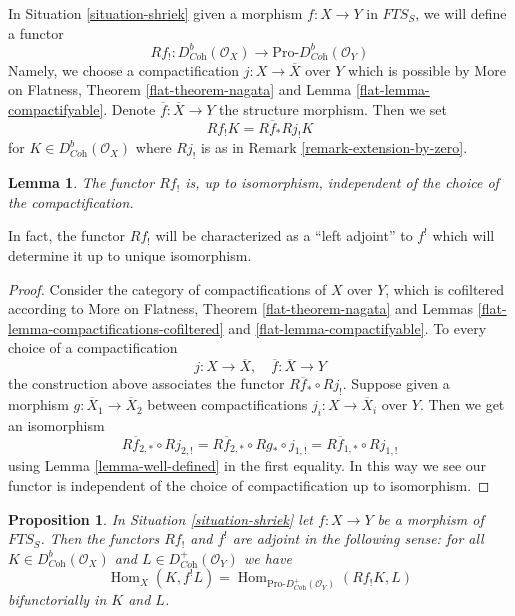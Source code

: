 \documentclass{stacks-project}
\theoremstyle{plain}
\newtheorem{proposition}[subsection]{Proposition}
\newtheorem{lemma}[subsection]{Lemma}
\theoremstyle{definition}
\theoremstyle{remark}
\numberwithin{equation}{subsection}
\def\Hom{\mathop{\mathrm{Hom}}\nolimits}
\begin{document}
\noindent
In Situation \ref{situation-shriek} given a morphism $f : X \to Y$
in $\textit{FTS}_S$, we will define a functor
$$
Rf_! : D^b_{\textit{Coh}}(\mathcal{O}_X)
\longrightarrow
\text{Pro-}D^b_{\textit{Coh}}(\mathcal{O}_Y)
$$
Namely, we choose a compactification $j : X \to \overline{X}$ over $Y$
which is possible by More on Flatness, Theorem \ref{flat-theorem-nagata} and
Lemma \ref{flat-lemma-compactifyable}. Denote
$\overline{f} : \overline{X} \to Y$ the structure morphism. Then we set
$$
Rf_!K  = R\overline{f}_* Rj_! K
$$
for $K \in D^b_{\textit{Coh}}(\mathcal{O}_X)$ where $Rj_!$ is
as in Remark \ref{remark-extension-by-zero}.

\begin{lemma}
\label{lemma-lower-shriek-well-defined}
The functor $Rf_!$ is, up to isomorphism, independent
of the choice of the compactification.
\end{lemma}

\noindent
In fact, the functor $Rf_!$ will be characterized as a ``left adjoint''
to $f^!$ which will determine it up to unique isomorphism.

\begin{proof}
Consider the category of compactifications of $X$ over $Y$, which is
cofiltered according to More on Flatness, Theorem \ref{flat-theorem-nagata} and
Lemmas \ref{flat-lemma-compactifications-cofiltered} and
\ref{flat-lemma-compactifyable}.
To every choice of a compactification
$$
j : X \to \overline{X},\quad \overline{f} : \overline{X} \to Y
$$
the construction above associates the functor $R\overline{f}_* \circ Rj_!$.
Suppose given a morphism $g : \overline{X}_1 \to \overline{X}_2$
between compactifications $j_i : X \to \overline{X}_i$ over $Y$.
Then we get an isomorphism
$$
R\overline{f}_{2, *} \circ Rj_{2, !} =
R\overline{f}_{2, *} \circ Rg_* \circ j_{1, !} =
R\overline{f}_{1, *} \circ Rj_{1, !}
$$
using Lemma \ref{lemma-well-defined} in the first equality. In this way
we see our functor is independent of the choice of compactification
up to isomorphism.
\end{proof}

\begin{proposition}
\label{proposition-duality-compactly-supported}
In Situation \ref{situation-shriek} let $f : X \to Y$ be a morphism of
$\textit{FTS}_S$. Then the functors $Rf_!$ and $f^!$ are adjoint in
the following sense: for all $K \in D^b_{\textit{Coh}}(\mathcal{O}_X)$
and $L \in D^+_{\textit{Coh}}(\mathcal{O}_Y)$ we have
$$
\Hom_X(K, f^!L) =
\Hom_{\text{Pro-}D^+_{\textit{Coh}}(\mathcal{O}_Y)}(Rf_!K, L)
$$
bifunctorially in $K$ and $L$.
\end{proposition}
\end{document}

